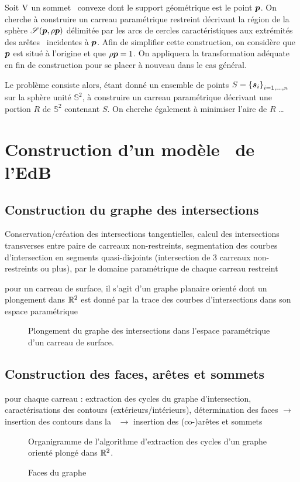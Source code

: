 Soit $\mathrm{V}$ un sommet \brep\ convexe dont le support géométrique est le point $\boldsymbol{p}$. 
On cherche à construire un carreau paramétrique restreint décrivant \ie la région de la sphère $\sphere[\p][\rho{\p}]$ délimitée par les arcs de cercles caractéristiques aux extrémités des arêtes \brep\ incidentes à $\boldsymbol{p}$. 
Afin de simplifier cette construction, on considère que $\boldsymbol{p}$ est situé à l'origine et que $\rho{\boldsymbol{p}} = 1$. 
On appliquera la transformation adéquate en fin de construction pour se placer à nouveau dans le cas général. 
\par
Le problème consiste alors, étant donné un ensemble de points $S = \left\{{\boldsymbol{s}}_{i}\right\}_{{i}={1},\ldots,{n}}$ sur la sphère unité $\mathbb{S}^2$, à construire un carreau paramétrique décrivant une portion $R$ de $\mathbb{S}^2$ contenant $S$. 
On cherche également à minimiser l'aire de $R$ \ldots




\section{Construction d'un modèle \brep\ de l'EdB}

\subsection{Construction du graphe des intersections}
Conservation/création des intersections tangentielles, calcul des intersections transverses entre paire de carreaux non-restreints, segmentation des courbes d'intersection en segments quasi-disjoints (intersection de 3 carreaux non-restreints ou plus),  par le domaine paramétrique de chaque carreau restreint
\par\bigskip
pour un carreau de surface, il s'agit d'un graphe planaire orienté dont un plongement dans $\mathbb{R}^2$ est donné par la trace des courbes d'intersections dans son espace paramétrique

\begin{figure}
\centering
{}
\caption{Plongement du graphe des intersections dans l'espace paramétrique d'un carreau de surface.}
\end{figure}


\subsection{Construction des faces, arêtes et sommets \brep}
pour chaque carreau : extraction des cycles du graphe d'intersection, caractérisations des contours (extérieurs/intérieurs), détermination des faces $\to$ insertion des contours dans la \brep\ $\to$ insertion des (co-)arêtes et sommets
\begin{figure}
	\centering
	
	\caption{Organigramme de l'algorithme d'extraction des cycles d'un graphe orienté plongé dans $\mathbb{R}^2$.}
\end{figure}


\begin{figure}
	\centering
	
	\caption{Faces du graphe}
\end{figure}